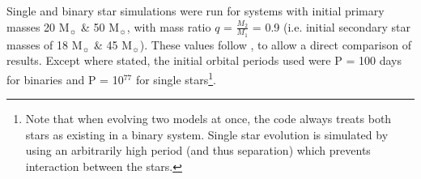 Single and binary star simulations were run for systems with initial primary masses 20 M$_{\sun}$ \& 50 M$_{\sun}$, with mass ratio $q$ = $\frac{M_2}{M_1}$ = 0.9 (i.e. initial secondary star masses of 18 M$_{\sun}$ \& 45 M$_{\sun}$). These values follow \cite{2019ApJ...884...38B}, to allow a direct comparison of results.
Except where stated, the initial orbital periods used were P = 100 days for binaries and P = 10$^{77}$ for single stars\footnote{Note that when evolving two models at once, the code always treats both stars as existing in a binary system. Single star evolution is simulated by using an arbitrarily high period (and thus separation) which prevents interaction between the stars.}.